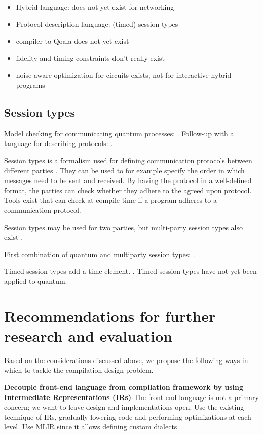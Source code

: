 \begin{itemize}
    \item Hybrid language: does not yet exist for networking
    \item Protocol description language: (timed) session types
    \item compiler to Qoala does not yet exist
    \item fidelity and timing constraints don't really exist
    \item noise-aware optimization for circuits exists, not for interactive hybrid programs
\end{itemize}

\subsection{Session types}
Model checking for communicating quantum processes: \cite{davidson_model_nodate}.
Follow-up with a language for describing protocols: \cite{ardeshir-larijani_automated_2018}.

Session types is a formalism used for defining communication protocols between different parties \cite{honda_language_1998}.
They can be used to for example specify the order in which messages need to be sent and received.
By having the protocol in a well-defined format, the parties can check whether they adhere to the agreed upon protocol.
Tools exist that can check at compile-time if a program adheres to a communication protocol.

Session types may be used for two parties, but multi-party session types also exist \cite{honda_multiparty_2016}.

First combination of quantum and multiparty session types: \cite{lanese_towards_2024}.

Timed session types add a time element. \cite{bartoletti_timed_2017}.
Timed session types have not yet been applied to quantum.

\section{Recommendations for further research and evaluation}
Based on the considerations discussed above, we propose the following ways in which to tackle the compilation design problem.


\textbf{Decouple front-end language from compilation framework by using Intermediate Representations (IRs)}
The front-end language is not a primary concern; we want to leave design and implementations open.
Use the existing technique of IRs, gradually lowering code and performing optimizations at each level.
Use MLIR since it allows defining custom dialects.

